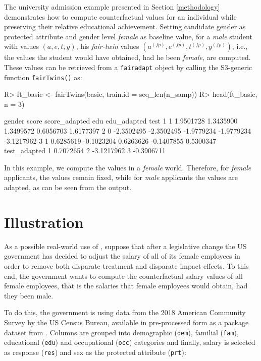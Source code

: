 \documentclass[
  nojss]{jss}
\begin{document}
The university admission example presented in Section \ref{methodology}
demonstrates how to compute counterfactual values for an individual
while preserving their relative educational achievement. Setting
candidate gender as protected attribute and gender level \emph{female}
as baseline value, for a \emph{male} student with values
\((a, e, t, y)\), his \emph{fair-twin} values
\(( {a}^{(fp)},  {e}^{(fp)},  {t}^{(fp)},  {y}^{(fp)})\), i.e., the
values the student would have obtained, had he been \emph{female}, are
computed. These values can be retrieved from a \texttt{fairadapt} object
by calling the S3-generic function \texttt{fairTwins()} as:

\begin{CodeChunk}
\begin{CodeInput}
R> ft_basic <- fairTwins(basic, train.id = seq_len(n_samp))
R> head(ft_basic, n = 3)
\end{CodeInput}
\begin{CodeOutput}
  gender      score score_adapted        edu edu_adapted       test
1      1  1.9501728     1.3435900  1.3499572   0.6056703  1.6177397
2      0 -2.3502495    -2.3502495 -1.9779234  -1.9779234 -3.1217962
3      1  0.6285619    -0.1023204  0.6263626  -0.1407855  0.5300347
  test_adapted
1    0.7072654
2   -3.1217962
3   -0.3906711
\end{CodeOutput}
\end{CodeChunk}

In this example, we compute the values in a \emph{female} world.
Therefore, for \emph{female} applicants, the values remain fixed, while
for \emph{male} applicants the values are adapted, as can be seen from
the output.

\hypertarget{illustration}{%
\section{Illustration}\label{illustration}}

As a possible real-world use of , suppose that after a
legislative change the US government has decided to adjust the salary of
all of its female employees in order to remove both disparate treatment
and disparate impact effects. To this end, the government wants to
compute the counterfactual salary values of all female employees, that
is the salaries that female employees would obtain, had they been male.

To do this, the government is using data from the 2018 American
Community Survey by the US Census Bureau, available in pre-processed
form as a package dataset from . Columns are grouped into
demographic (\texttt{dem}), familial (\texttt{fam}), educational
(\texttt{edu}) and occupational (\texttt{occ}) categories and finally,
salary is selected as response (\texttt{res}) and sex as the protected
attribute (\texttt{prt}):
\end{document}
